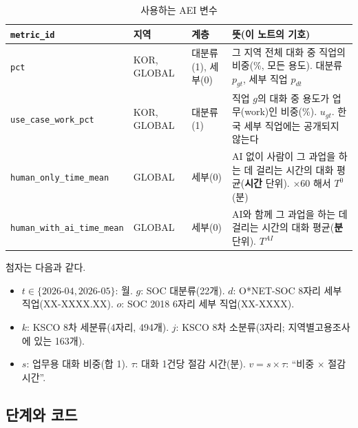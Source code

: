 \documentclass[11pt]{article}
\begin{document}
\begin{longtable}{L{4.6cm}L{2.0cm}L{2.2cm}L{7.4cm}}
\caption{사용하는 AEI 변수}\label{tab:vars}\\
\toprule
\texttt{metric\_id} & 지역 & 계층 & 뜻(이 노트의 기호) \\
\midrule
\endfirsthead
\texttt{pct} & KOR, GLOBAL & 대분류(1), 세부(0) & 그 지역 전체 대화 중 직업의 비중(\%, 모든 용도). 대분류 $p_{gt}$, 세부 직업 $p_{dt}$ \\
\texttt{use\_case\_work\_pct} & KOR, GLOBAL & 대분류(1) & 직업 $g$의 대화 중 용도가 업무(work)인 비중(\%). $u_{gt}$. 한국 세부 직업에는 공개되지 않는다 \\
\texttt{human\_only\_time\_mean} & GLOBAL & 세부(0) & AI 없이 사람이 그 과업을 하는 데 걸리는 시간의 대화 평균(\textbf{시간} 단위). $\times 60$ 해서 $T^{0}$(분) \\
\texttt{human\_with\_ai\_time\_mean} & GLOBAL & 세부(0) & AI와 함께 그 과업을 하는 데 걸리는 시간의 대화 평균(\textbf{분} 단위). $T^{AI}$ \\
\bottomrule
\end{longtable}

\noindent 첨자는 다음과 같다.
\begin{itemize}[leftmargin=*]
  \item $t \in \{\text{2026-04}, \text{2026-05}\}$: 월. $g$: SOC 대분류(22개). $d$: O*NET-SOC 8자리 세부 직업(XX-XXXX.XX). $o$: SOC 2018 6자리 세부 직업(XX-XXXX).
  \item $k$: KSCO 8차 세분류(4자리, 494개). $j$: KSCO 8차 소분류(3자리; 지역별고용조사에 있는 163개).
  \item $s$: 업무용 대화 비중(합 1). $\tau$: 대화 1건당 절감 시간(분). $v = s \times \tau$: ``비중 $\times$ 절감 시간''.
\end{itemize}

\subsection{단계와 코드}
\end{document}
